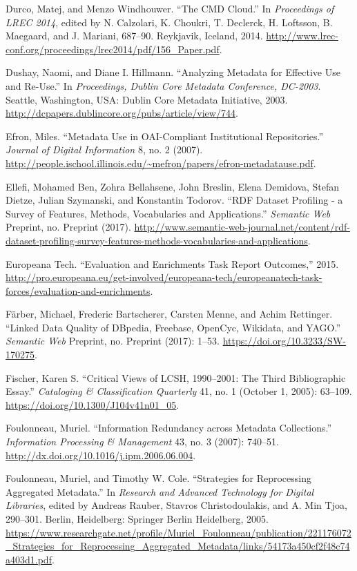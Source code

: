 Durco, Matej, and Menzo Windhouwer. “The CMD Cloud.” In \emph{Proceedings of LREC 2014}, edited by N. Calzolari, K. Choukri, T. Declerck, H. Loftsson, B. Maegaard, and J. Mariani, 687–90. Reykjavik, Iceland, 2014. \url{http://www.lrec-conf.org/proceedings/lrec2014/pdf/156_Paper.pdf}.

Dushay, Naomi, and Diane I. Hillmann. “Analyzing Metadata for Effective Use and Re-Use.” In \emph{Proceedings, Dublin Core Metadata Conference, DC-2003}. Seattle, Washington, USA: Dublin Core Metadata Initiative, 2003. \url{http://dcpapers.dublincore.org/pubs/article/view/744}.

Efron, Miles. “Metadata Use in OAI-Compliant Institutional Repositories.” \emph{Journal of Digital Information} 8, no. 2 (2007). \url{http://people.ischool.illinois.edu/~mefron/papers/efron-metadatause.pdf}.

Ellefi, Mohamed Ben, Zohra Bellahsene, John Breslin, Elena Demidova, Stefan Dietze, Julian Szymanski, and Konstantin Todorov. “RDF Dataset Profiling - a Survey of Features, Methods, Vocabularies and Applications.” \emph{Semantic Web} Preprint, no. Preprint (2017). \url{http://www.semantic-web-journal.net/content/rdf-dataset-profiling-survey-features-methods-vocabularies-and-applications}.

Europeana Tech. “Evaluation and Enrichments Task Report Outcomes,” 2015. \url{http://pro.europeana.eu/get-involved/europeana-tech/europeanatech-task-forces/evaluation-and-enrichments}.

Färber, Michael, Frederic Bartscherer, Carsten Menne, and Achim Rettinger. “Linked Data Quality of DBpedia, Freebase, OpenCyc, Wikidata, and YAGO.” \emph{Semantic Web} Preprint, no. Preprint (2017): 1–53. \url{https://doi.org/10.3233/SW-170275}.

Fischer, Karen S. “Critical Views of LCSH, 1990–2001: The Third Bibliographic Essay.” \emph{Cataloging \& Classification Quarterly} 41, no. 1 (October 1, 2005): 63–109. \url{https://doi.org/10.1300/J104v41n01_05}.

Foulonneau, Muriel. “Information Redundancy across Metadata Collections.” \emph{Information Processing \& Management} 43, no. 3 (2007): 740–51. \url{http://dx.doi.org/10.1016/j.ipm.2006.06.004}.

Foulonneau, Muriel, and Timothy W. Cole. “Strategies for Reprocessing Aggregated Metadata.” In \emph{Research and Advanced Technology for Digital Libraries}, edited by Andreas Rauber, Stavros Christodoulakis, and A. Min Tjoa, 290–301. Berlin, Heidelberg: Springer Berlin Heidelberg, 2005. \url{https://www.researchgate.net/profile/Muriel_Foulonneau/publication/221176072_Strategies_for_Reprocessing_Aggregated_Metadata/links/54173a450cf2f48c74a403d1.pdf}.

